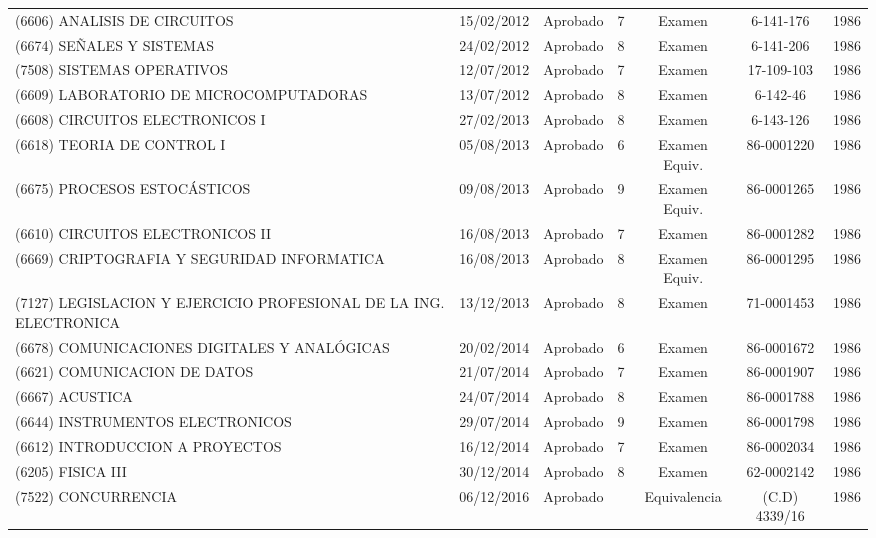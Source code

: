 \begin{table}[htb]
\begin{tabular}{p{4cm} *{6}{c}}
    (6606) ANALISIS DE CIRCUITOS & 15/02/2012 & Aprobado & 7 & Examen & 6-141-176 & 1986 \tabularnewline

    (6674) SEÑALES Y SISTEMAS & 24/02/2012 & Aprobado & 8 & Examen & 6-141-206 & 1986 \tabularnewline

    (7508) SISTEMAS OPERATIVOS & 12/07/2012 & Aprobado & 7 & Examen & 17-109-103 & 1986 \tabularnewline

    (6609) LABORATORIO DE MICROCOMPUTADORAS & 13/07/2012 & Aprobado & 8 & Examen & 6-142-46 & 1986 \tabularnewline

    (6608) CIRCUITOS ELECTRONICOS I & 27/02/2013 & Aprobado & 8 & Examen & 6-143-126 & 1986 \tabularnewline

    (6618) TEORIA DE CONTROL I & 05/08/2013 & Aprobado & 6 & Examen Equiv. & 86-0001220 & 1986 \tabularnewline

    (6675) PROCESOS ESTOCÁSTICOS & 09/08/2013 & Aprobado & 9 & Examen Equiv. & 86-0001265 & 1986 \tabularnewline

    (6610) CIRCUITOS ELECTRONICOS II & 16/08/2013 & Aprobado & 7 & Examen & 86-0001282 & 1986 \tabularnewline

    (6669) CRIPTOGRAFIA Y SEGURIDAD INFORMATICA & 16/08/2013 & Aprobado & 8 & Examen Equiv. & 86-0001295 & 1986 \tabularnewline

    (7127) LEGISLACION Y EJERCICIO PROFESIONAL DE LA ING. ELECTRONICA & 13/12/2013 & Aprobado & 8 & Examen & 71-0001453 & 1986 \tabularnewline

    (6678) COMUNICACIONES DIGITALES Y ANALÓGICAS & 20/02/2014 & Aprobado & 6 & Examen & 86-0001672 & 1986 \tabularnewline

    (6621) COMUNICACION DE DATOS & 21/07/2014 & Aprobado & 7 & Examen & 86-0001907 & 1986 \tabularnewline

    (6667) ACUSTICA & 24/07/2014 & Aprobado & 8 & Examen & 86-0001788 & 1986 \tabularnewline

    (6644) INSTRUMENTOS ELECTRONICOS & 29/07/2014 & Aprobado & 9 & Examen & 86-0001798 & 1986 \tabularnewline

    (6612) INTRODUCCION A PROYECTOS & 16/12/2014 & Aprobado & 7 & Examen & 86-0002034 & 1986 \tabularnewline

    (6205) FISICA III & 30/12/2014 & Aprobado & 8 & Examen & 62-0002142 & 1986 \tabularnewline

    (7522) CONCURRENCIA & 06/12/2016 & Aprobado & & Equivalencia & (C.D) 4339/16 & 1986  \tabularnewline

  \bottomrule
  \end{tabular}
\end{table}